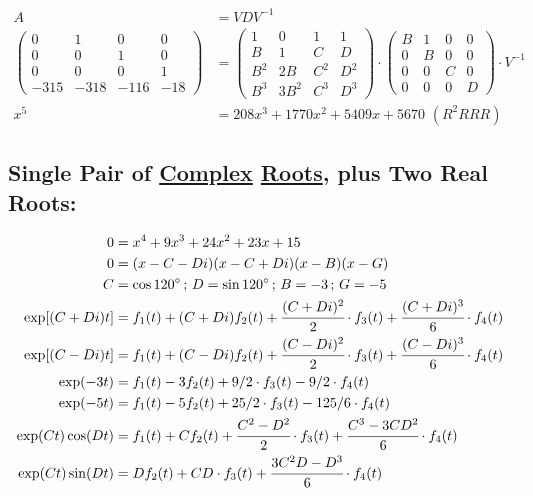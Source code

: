 \documentclass[12pt,a4paper]{article}
\begin{document}
\begin{align}
A &= VDV^{-1} \\
\left( \begin{matrix} 0 & 1 & 0 & 0 \\ 0 & 0 & 1 & 0 \\ 0 & 0 & 0 & 1 \\ -315 & -318 & -116 & -18 \end{matrix} \right)
&=
\left( \begin{matrix}  1 & 0 & 1 & 1 \\ B & 1 & C & D \\ B^2 & 2B & C^2 & D^2 \\ B^3 & 3B^2 & C^3 & D^3  \end{matrix} \right) \cdot
\left( \begin{matrix}  B & 1 & 0 & 0 \\ 0 & B & 0 & 0 \\ 0 & 0 & C & 0 \\ 0 & 0 & 0 & D  \end{matrix} \right) \cdot V^{-1} \\
x^5 &= 208 x^3 + 1770 x^2 + 5409 x + 5670\,\,(R^2RRR)
\end{align}

\subsection{Single Pair of \href{}{Complex} \href{}{Roots}, plus Two Real Roots:}

\begin{align}
0 &= x^4 + 9 x^3 + 24 x^2 + 23 x + 15  \\
0 &= (x - C - Di)(x - C + Di)(x - B)(x - G) \\
C &= \cos 120\degree\,;\,D = \sin 120\degree\,;\,B = -3\,;\,G = -5 \\
\exp [(C + Di)t] &= f_1(t) + (C + Di) f_2(t) + \cfrac{(C + Di)^2}{2}\cdot f_3(t) + \cfrac{(C + Di)^3}{6}\cdot f_4(t) \\
\exp [(C - Di)t] &= f_1(t) + (C - Di) f_2(t) + \cfrac{(C - Di)^2}{2}\cdot f_3(t) + \cfrac{(C - Di)^3}{6}\cdot f_4(t) \\
\exp (-3t) &= f_1(t) - 3 f_2(t) + 9/2\cdot f_3(t) - 9/2\cdot f_4(t) \\
\exp (-5t) &= f_1(t) - 5 f_2(t) + 25/2\cdot f_3(t) - 125/6\cdot f_4(t) \\
\exp (Ct) \cos (Dt) &= f_1(t) + C f_2(t) + \cfrac{C^2 - D^2}{2}\cdot f_3(t) + \cfrac{C^3 - 3C D^2}{6}\cdot f_4(t) \\
\exp (Ct) \sin (Dt) &= D f_2(t) + CD\cdot f_3(t) + \cfrac{3C^2D - D^3}{6}\cdot f_4(t)
\end{align}
\end{document}
